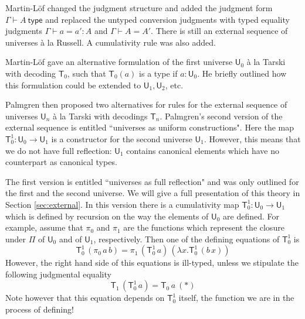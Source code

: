 \documentclass[11pt,a4paper]{article}
\def\UU{\mathsf{U}}
\newcommand{\type}{\mathsf{type}}
\newcommand{\T}{\mathsf{T}}
\begin{document}
Martin-Löf \cite{martinlof:hannover} changed the judgment structure and added the judgment form $\Gamma \vdash A\ \type$
and replaced the untyped conversion judgments with typed equality judgments $\Gamma \vdash a = a' : A$ and $\Gamma \vdash A = A'$. There is still an external sequence of universes \`a la Russell. A cumulativity rule was also added.

Martin-Löf \cite{martinlof:padova} gave an alternative formulation of the first universe $\UU_0$ \`a la Tarski with decoding $\T_0$, such that $\T_0(a)$ is a type if $a : \UU_0$. He briefly outlined how this formulation could be extended to $\UU_1, \UU_2$, etc.

Palmgren \cite{palmgren:venice} then proposed two alternatives for rules for the external sequence of universes $\UU_n$ \`a la Tarski with decodings $\T_n$.
Palmgren's second version of the external sequence is entitled ``universes as uniform constructions". Here the map $\T_0^1 : \UU_0 \to \UU_1$ is a constructor for the second universe $\UU_1$. However, this means that we do not have full reflection: $\UU_1$ contains canonical elements which have no counterpart as canonical types.

The first version is entitled ``universes as full reflection" and was only outlined for the first and the second universe. We will give a full presentation of this theory in Section \ref{sec:external}. In this version there is a cumulativity map $\T_0^1 : \UU_0 \to \UU_1$ which is defined by recursion on the way the elements of $\UU_0$ are defined. For example, assume that $\pi_0$ and $\pi_1$ are the functions which represent the closure under $\Pi$ of $\UU_0$ and of $\UU_1$, respectively. Then one of the defining equations of $\T_0^1$ is
$$
\T_0^1\, (\pi_0\,a\, b) = \pi_1\,(\T_0^1\,a)\,(\lambda x.\T_0^1\,(b\,x))
$$
However, the right hand side of this equations is ill-typed, unless we stipulate the following judgmental equality
$$
\T_1\, (\T_0^1\, a) = \T_0\, a\ (*)
$$
Note however that this equation depends on $\T_0^1$ itself, the function we are in the process of defining!
\end{document}
